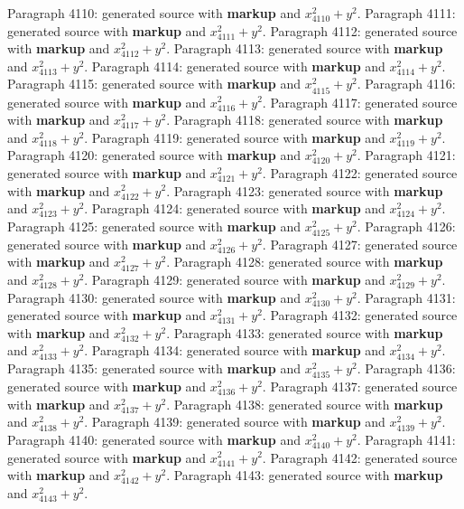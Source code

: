 \documentclass{article}
\begin{document}
Paragraph 4110: generated source with \textbf{markup} and $x_{4110}^2 + y^2$.
Paragraph 4111: generated source with \textbf{markup} and $x_{4111}^2 + y^2$.
Paragraph 4112: generated source with \textbf{markup} and $x_{4112}^2 + y^2$.
Paragraph 4113: generated source with \textbf{markup} and $x_{4113}^2 + y^2$.
Paragraph 4114: generated source with \textbf{markup} and $x_{4114}^2 + y^2$.
Paragraph 4115: generated source with \textbf{markup} and $x_{4115}^2 + y^2$.
Paragraph 4116: generated source with \textbf{markup} and $x_{4116}^2 + y^2$.
Paragraph 4117: generated source with \textbf{markup} and $x_{4117}^2 + y^2$.
Paragraph 4118: generated source with \textbf{markup} and $x_{4118}^2 + y^2$.
Paragraph 4119: generated source with \textbf{markup} and $x_{4119}^2 + y^2$.
Paragraph 4120: generated source with \textbf{markup} and $x_{4120}^2 + y^2$.
Paragraph 4121: generated source with \textbf{markup} and $x_{4121}^2 + y^2$.
Paragraph 4122: generated source with \textbf{markup} and $x_{4122}^2 + y^2$.
Paragraph 4123: generated source with \textbf{markup} and $x_{4123}^2 + y^2$.
Paragraph 4124: generated source with \textbf{markup} and $x_{4124}^2 + y^2$.
Paragraph 4125: generated source with \textbf{markup} and $x_{4125}^2 + y^2$.
Paragraph 4126: generated source with \textbf{markup} and $x_{4126}^2 + y^2$.
Paragraph 4127: generated source with \textbf{markup} and $x_{4127}^2 + y^2$.
Paragraph 4128: generated source with \textbf{markup} and $x_{4128}^2 + y^2$.
Paragraph 4129: generated source with \textbf{markup} and $x_{4129}^2 + y^2$.
Paragraph 4130: generated source with \textbf{markup} and $x_{4130}^2 + y^2$.
Paragraph 4131: generated source with \textbf{markup} and $x_{4131}^2 + y^2$.
Paragraph 4132: generated source with \textbf{markup} and $x_{4132}^2 + y^2$.
Paragraph 4133: generated source with \textbf{markup} and $x_{4133}^2 + y^2$.
Paragraph 4134: generated source with \textbf{markup} and $x_{4134}^2 + y^2$.
Paragraph 4135: generated source with \textbf{markup} and $x_{4135}^2 + y^2$.
Paragraph 4136: generated source with \textbf{markup} and $x_{4136}^2 + y^2$.
Paragraph 4137: generated source with \textbf{markup} and $x_{4137}^2 + y^2$.
Paragraph 4138: generated source with \textbf{markup} and $x_{4138}^2 + y^2$.
Paragraph 4139: generated source with \textbf{markup} and $x_{4139}^2 + y^2$.
Paragraph 4140: generated source with \textbf{markup} and $x_{4140}^2 + y^2$.
Paragraph 4141: generated source with \textbf{markup} and $x_{4141}^2 + y^2$.
Paragraph 4142: generated source with \textbf{markup} and $x_{4142}^2 + y^2$.
Paragraph 4143: generated source with \textbf{markup} and $x_{4143}^2 + y^2$.
\end{document}
